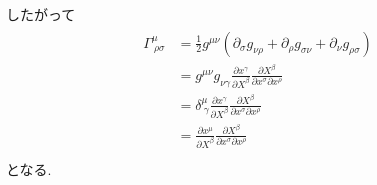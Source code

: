 \documentclass[uplatex,a4j,11pt,dvipdfmx]{jsarticle}
\begin{document}
したがって
\begin{align}
  \begin{split}  
    \Gamma^{\mu}_{\ \rho\sigma}&=\frac{1}{2}g^{\mu\nu}\left(\partial_\sigma g_{\nu\rho}+\partial_\rho g_{\sigma\nu}+\partial_\nu g_{\rho\sigma}\right)\\
    &=g^{\mu\nu}g_{\nu\gamma}\frac{\partial x^\gamma}{\partial X^\beta}\frac{\partial X^\beta}{\partial x^\sigma\partial x^\rho}\\
    &=\delta^{\mu}_{\ \gamma}\frac{\partial x^\gamma}{\partial X^\beta}\frac{\partial X^\beta}{\partial x^\sigma\partial x^\rho}\\
    &=\frac{\partial x^\mu}{\partial X^\beta}\frac{\partial X^\beta}{\partial x^\sigma\partial x^\rho}\\
  \end{split}
\end{align}
となる.
\end{document}
